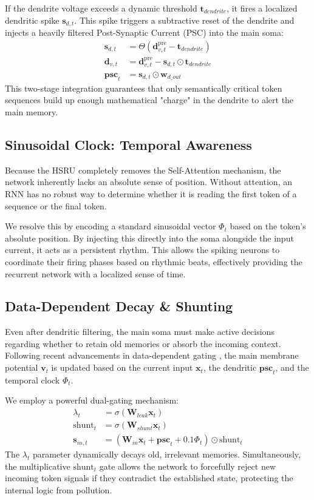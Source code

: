 \documentclass[11pt,a4paper]{article}
\begin{document}
If the dendrite voltage exceeds a dynamic threshold $\mathbf{t}_{dendrite}$, it fires a localized dendritic spike $\mathbf{s}_{d,t}$. This spike triggers a subtractive reset of the dendrite and injects a heavily filtered Post-Synaptic Current (PSC) into the main soma:
\begin{align}
    \mathbf{s}_{d, t} &= \Theta(\mathbf{d}_{v, t}^{\text{pre}} - \mathbf{t}_{dendrite}) \\
    \mathbf{d}_{v, t} &= \mathbf{d}_{v, t}^{\text{pre}} - \mathbf{s}_{d, t} \odot \mathbf{t}_{dendrite} \\
    \mathbf{psc}_t &= \mathbf{s}_{d, t} \odot \mathbf{w}_{d\_out}
\end{align}
This two-stage integration guarantees that only semantically critical token sequences build up enough mathematical "charge" in the dendrite to alert the main memory.

\subsection{Sinusoidal Clock: Temporal Awareness}
Because the HSRU completely removes the Self-Attention mechanism, the network inherently lacks an absolute sense of position. Without attention, an RNN has no robust way to determine whether it is reading the first token of a sequence or the final token. 

We resolve this by encoding a standard sinusoidal vector $\Phi_t$ based on the token's absolute position. By injecting this directly into the soma alongside the input current, it acts as a persistent rhythm. This allows the spiking neurons to coordinate their firing phases based on rhythmic beats, effectively providing the recurrent network with a localized sense of time.

\subsection{Data-Dependent Decay \& Shunting}
Even after dendritic filtering, the main soma must make active decisions regarding whether to retain old memories or absorb the incoming context. Following recent advancements in data-dependent gating \cite{peng2023rwkv, sun2023retentive}, the main membrane potential $\mathbf{v}_t$ is updated based on the current input $\mathbf{x}_t$, the dendritic $\mathbf{psc}_t$, and the temporal clock $\Phi_t$. 

We employ a powerful dual-gating mechanism:
\begin{align}
    \lambda_t &= \sigma(\mathbf{W}_{leak} \mathbf{x}_t) \\
    \text{shunt}_t &= \sigma(\mathbf{W}_{shunt} \mathbf{x}_t) \\
    \mathbf{s}_{in, t} &= \left( \mathbf{W}_{in} \mathbf{x}_t + \mathbf{psc}_t + 0.1 \Phi_t \right) \odot \text{shunt}_t
\end{align}
The $\lambda_t$ parameter dynamically decays old, irrelevant memories. Simultaneously, the multiplicative $\text{shunt}_t$ gate allows the network to forcefully reject new incoming token signals if they contradict the established state, protecting the internal logic from pollution.
\end{document}
